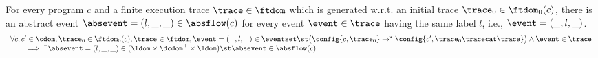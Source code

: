 \begin{lemma}
    \label{lem:abscfg_sound}
    For every program $c$ and
    a finite execution trace $\trace \in \ftdom$ which is generated w.r.t.
    an initial trace  $\trace_0 \in \ftdom_0(c)$,
    there is an abstract event $\absevent = (l, \_, \_) \in \absflow(c)$ 
    for every event $\event \in \trace$ having the same label $l$, i.e., $\event = (\_, l, \_)$.
    \[
    \begin{array}{l}
      \forall c, c' \in \cdom, \trace_0 \in \ftdom_0(c), \trace \in \ftdom ,  \event = (\_, l, \_) \in \eventset \st
      \big(
        \config{{c}, \trace_0} \to^{*} \config{c', \trace_0 \tracecat \trace} 
      \big)
      \land \event \in \trace 
      \\
      \qquad \implies \exists \absevent = (l, \_, \_) \in (\ldom\times \dcdom^{\top} \times \ldom) \st 
      \absevent \in \absflow(c)
    \end{array}
    \]
  \end{lemma}
